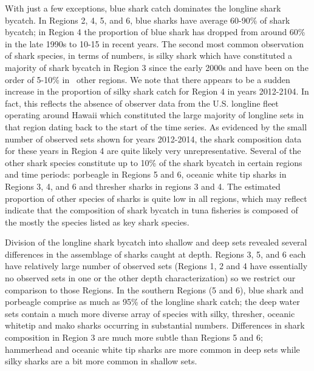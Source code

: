 \documentclass[12pt]{SCreport}
\begin{document}
With just a few exceptions, blue shark catch dominates the longline shark bycatch.  In Regions 2, 4, 5, and 6, blue sharks have average 60-90\% of shark bycatch; in Region 4 the proportion of blue shark has dropped from around 60\% in the late 1990s to 10-15 in recent years.  The second most common observation of shark species, in terms of numbers, is silky shark which have constituted a majority of shark bycatch in Region 3 since the early 2000s and have been on the order of 5-10\% in \ other regions.  We note that there appears to be a sudden increase in the proportion of silky shark catch for Region 4 in years 2012-2104.  In fact, this reflects the absence of observer data from the U.S. longline fleet operating around Hawaii which constituted the large majority of longline sets in that region dating back to the start of the time series.  As evidenced by the small number of observed sets shown for years 2012-2014, the shark composition data for these years in Region 4 are quite likely very unrepresentative.  Several of the other shark species constitute up to 10\% of the shark bycatch in certain regions and time periods: porbeagle in Regions 5 and 6, oceanic white tip sharks in Regions 3, 4, and 6 and thresher sharks in regions 3 and 4.  The estimated proportion of other species of sharks is quite low in all regions, which may reflect indicate that the   composition of shark bycatch in tuna fisheries is composed of the mostly the species listed as key shark species. 

Division of the longline shark bycatch into shallow and deep sets revealed several differences in the assemblage of sharks caught at depth.  Regions 3, 5, and 6 each have relatively large number of observed sets (Regions 1, 2 and 4 have essentially no observed sets in one or the other depth characterization) so we restrict our comparison to those Regions.  In the southern Regions (5 and 6), blue shark and porbeagle comprise as much as 95\% of the longline shark catch; the deep water sets contain a much more diverse array of species with silky, thresher, oceanic whitetip and mako sharks occurring in substantial numbers.  Differences in shark composition in Region 3 are much more subtle than Regions 5 and 6; hammerhead and oceanic white tip sharks are more common in deep sets while silky sharks are a bit more common in shallow sets. 
\end{document}
